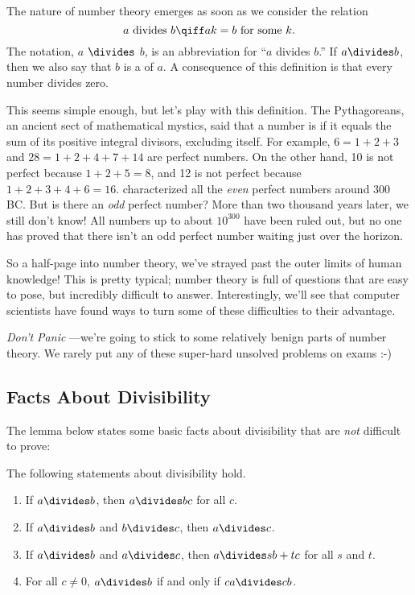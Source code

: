 The nature of number theory emerges as soon as we consider the
 relation
\[
a \text{ divides } b \qiff ak = b \text{ for some } k.
\]
The notation, $a$ $\divides$ $b$,
is an abbreviation for ``$a$ divides $b$.''  If $a \divides b$, then
we also say that $b$ is a  of $a$.  A consequence of
this definition is that every number divides zero.

This seems simple enough, but let's play with this definition.  The
Pythagoreans, an ancient sect of mathematical mystics, said that a number
is  if it equals the sum of its
positive integral divisors, excluding itself.  For example, $6 = 1 + 2 +
3$ and $28 = 1 + 2 + 4 + 7 + 14$ are perfect numbers.  On the other hand,
10 is not perfect because $1 + 2 + 5 = 8$, and 12 is not perfect because
$1 + 2 + 3 + 4 + 6 = 16$.   characterized all the \emph{even}
perfect numbers around 300 BC.  But is there an \emph{odd} perfect number?
More than two thousand years later, we still don't know!  All numbers up
to about $10^{300}$ have been ruled out, but no one has proved that there
isn't an odd perfect number waiting just over the horizon.

So a half-page into number theory, we've strayed past the outer limits
of human knowledge!  This is pretty typical; number theory is full of
questions that are easy to pose, but incredibly difficult to answer.
Interestingly, we'll see that computer scientists have found ways to
turn some of these difficulties to their advantage.

\emph{Don't Panic} ---we're going to stick to some relatively benign parts
of number theory.  We rarely put any of these super-hard unsolved problems
on exams :-)

\subsection{Facts About Divisibility}

The lemma below states some basic facts about divisibility that are
\emph{not} difficult to prove:

\begin{lemma}
\label{lem:div}
The following statements about divisibility hold.
%
\begin{enumerate}
\item If $a \divides b$, then $a \divides bc$ for all $c$.
\item If $a \divides b$ and $b \divides c$, then $a \divides c$.

\item\label{lem:divsbtc} If $a \divides b$ and $a \divides c$,
then $a \divides sb + tc$ for all $s$ and $t$.

\item For all $c \neq 0$, $a \divides b$ if and only if $ca \divides cb$.
\end{enumerate}
\end{lemma}

